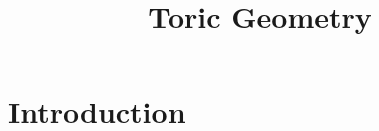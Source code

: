 \documentclass{worksheetclass}
\title{Toric Geometry}
\begin{document}
\maketitle

\tableofcontents

\section{Introduction}

   
\end{document}
